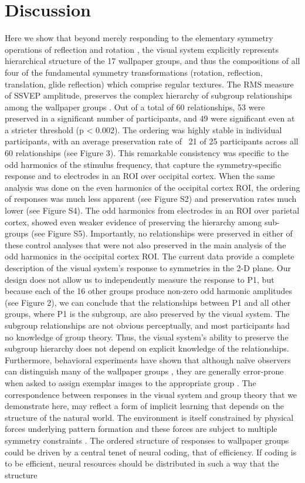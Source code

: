 \documentclass[9pt,twocolumn,twoside,lineno]{pnas-new}
\begin{document}
\section*{Discussion}

Here we show that beyond merely responding to the elementary symmetry operations of reflection \cite{RN1170} and rotation \cite{RN1725}, the visual system explicitly represents hierarchical structure of the 17 wallpaper groups, and thus the compositions of all four of the fundamental symmetry transformations (rotation, reflection, translation, glide reflection) which comprise regular textures. The RMS measure of SSVEP amplitude, preserves the complex hierarchy of subgroup relationships among the wallpaper groups \cite{RN1711}. Out of a total of 60 relationships, 53 were preserved in a significant number of participants, and 49 were significant even at a stricter threshold (p < 0.002). The ordering was highly stable in individual participants, with an average preservation rate of ~21 of 25 participants across all 60 relationships (see Figure 3). This remarkable consistency was specific to the odd harmonics of the stimulus frequency, that capture the symmetry-specific response \cite{RN1725} and to electrodes in an ROI over occipital cortex. When the same analysis was done on the even harmonics of the occipital cortex ROI, the ordering of responses was much less apparent (see Figure S2) and preservation rates much lower (see Figure S4). The odd harmonics from electrodes in an ROI over parietal cortex, showed even weaker evidence of preserving the hierarchy among sub-groups (see Figure S5). Importantly, no relationships were preserved in either of these control analyses that were not also preserved in the main analysis of the odd harmonics in the occipital cortex ROI. The current data provide a complete description of the visual system’s response to symmetries in the 2-D plane. Our design does not allow us to independently measure the response to P1, but because each of the 16 other groups produce non-zero odd harmonic amplitudes (see Figure 2), we can conclude that the relationships between P1 and all other groups, where P1 is the subgroup, are also preserved by the visual system. The subgroup relationships are not obvious perceptually, and most participants had no knowledge of group theory. Thus, the visual system’s ability to preserve the subgroup hierarchy does not depend on explicit knowledge of the relationships. Furthermore, behavioral experiments have shown that although naïve observers can distinguish many of the wallpaper groups \cite{RN1253}, they are generally error-prone when asked to assign exemplar images to the appropriate group \cite{RN172}. The correspondence between responses in the visual system and group theory that we demonstrate here, may reflect a form of implicit learning that depends on the structure of the natural world. The environment is itself constrained by physical forces underlying pattern formation and these forces are subject to multiple symmetry constraints \cite{RN1634}. The ordered structure of responses to wallpaper groups could be driven by a central tenet of neural coding, that of efficiency. If coding is to be efficient, neural resources should be distributed in such a way that the structure 
\end{document}
